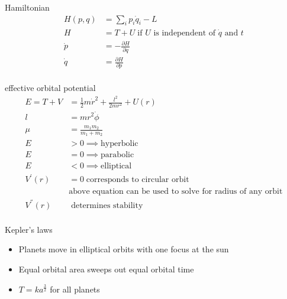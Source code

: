 \documentclass[avery5388, frame]{flashcards}
\begin{document}
\begin{flashcard}{Hamiltonian}
  {
    \begin{align*}
      H(p, q) &= \sum_{i} p_{i} \dot{q}_{i} - L\\
      H &= T + U \; \textrm{if $U$ is independent of $\dot{q}$ and $t$}\\
      \dot{p} &= - \frac{\partial H}{\partial q}\\
      \dot{q} &= \frac{\partial H}{\partial p}\\
    \end{align*}
  }
\end{flashcard}

\begin{flashcard}{effective orbital potential}
  {
    \begin{align*}
      E = T + V &= \frac{1}{2} m \dot{r}^{2} + \frac{l^2}{2 m r^{2}} + U(r)\\
      l &= m r^{2} \dot{\phi}\\
      \mu &= \frac{m_{1} m_{2}}{m_{1} + m_{2}}\\
      E &> 0 \implies \textrm{hyperbolic}\\
      E &= 0 \implies \textrm{parabolic}\\
      E &< 0 \implies \textrm{elliptical}\\
      V^{'}(r) &= 0 \; \textrm{corresponds to circular orbit}\\
      &\textrm{above equation can be used to solve for radius of any orbit}\\
      V^{''}(r)& \; \textrm{determines stability}\\
    \end{align*}
  }
\end{flashcard}

\begin{flashcard}{Kepler's laws}
  {
    \begin{itemize}
    \item Planets move in elliptical orbits with one focus at the sun
    \item Equal orbital area sweeps out equal orbital time
    \item $T = ka^{\frac{3}{2}}$ for all planets
    \end{itemize}
  }
\end{flashcard}
\end{document}
